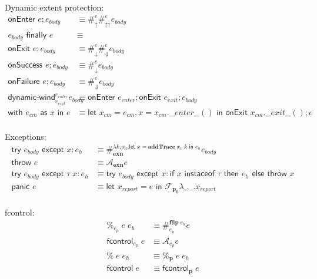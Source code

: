 \documentclass[11pt]{article}
\newcommand{\letin}[2]{\textsf{let }#1\textsf{ in }#2}
\newcommand\F{\mathcal{F}}
\begin{document}
Dynamic extent protection:
\begin{align*}
\textsf{onEnter }e; e_{body} &\equiv
	\#_\uparrow^e\#_\upuparrows^ee_{body}
	\\
e_{body}\textsf{ finally }e &\equiv \\
	\textsf{onExit }e; e_{body} &\equiv
	\#_\downarrow^e\#_\Downarrow^ee_{body}
	\\
\textsf{onSuccess }e; e_{body} &\equiv
	\#_\downarrow^ee_{body}
	\\
\textsf{onFailure }e; e_{body} &\equiv
	\#_\Downarrow^ee_{body}
	\\
\textsf{dynamic-wind}^{e_{enter}}_{e_{exit}}e_{body} &\equiv
	\textsf{onEnter }e_{enter}; \textsf{onExit }e_{exit}; e_{body}
	\\
\textsf{with }e_{cm}\textsf{ as }x\textsf{ in }e &\equiv
	\letin{x_{cm}=e_{cm},x=x_{cm}.\_\_enter\_\_()}{\textsf{onExit }x_{cm}.\_\_exit\_\_(); e}
	\\
\end{align*}

Exceptions:
\begin{align*}
\textsf{try }e_{body}\textsf{ except }x:e_h &\equiv
	\#_\textbf{exn}^{\lambda k,x_v.\letin{x=\textbf{addTrace}\;x_v\;k}{e_h}}e_{body}
	\\
\textsf{throw }e &\equiv
	\mathcal A_\textbf{exn}e
	\\
\textsf{try }e_{body}\textsf{ except }\tau\;x:e_h &\equiv
	\textsf{try }e_{body}\textsf{ except }x:
		\textsf{if }x\textsf{ instaceof }\tau
		\textsf{ then }e_h
		\textsf{ else throw }x
	\\
\textsf{panic }e &\equiv
	\letin{x_{report} = e}{\F_\mathbf{p_0}\lambda \_,\_.x_{report}}
	\\
\end{align*}

fcontrol:
\begin{align*}
\%_{e_p}\;e\;e_h &\equiv
	\#_{e_p}^{\textbf{flip}\;e_h}e
	\\
\textsf{fcontrol}_{e_p}\;e &\equiv
	\mathcal A_{e_p}e
	\\
\%\;e\;e_h &\equiv
	\%_\mathbf{p}\;e\;e_h
	\\
\textsf{fcontrol}\;e &\equiv
	\textsf{fcontrol}_\mathbf{p}\;e
	\\
\end{align*}
\end{document}
